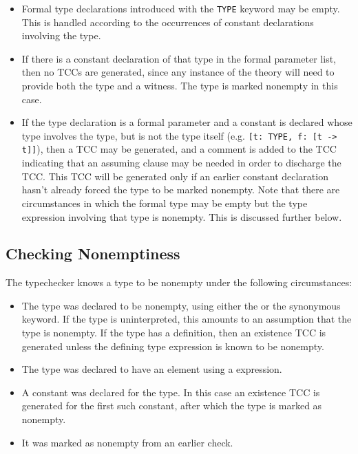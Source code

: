 \begin{itemize}

\item Formal type declarations introduced with the \texttt{TYPE} keyword may
be empty.  This is handled according to the occurrences of constant
declarations involving the type.

\item If there is a constant declaration of that type in the formal
parameter list, then no TCCs are generated, since
any instance of the theory will need to provide both the type and a
witness.  The type is marked nonempty in this case.

\item If the type declaration is a formal parameter and a constant is
declared whose type involves the type, but is not the type itself (e.g.
\texttt{[t:\ TYPE, f:\ [t -> t]]}), then a
TCC may be generated, and a comment is added to the TCC indicating that an
assuming clause may be needed in order to discharge the TCC.  This TCC
will be generated only if an earlier constant declaration hasn't already
forced the type to be marked nonempty.  Note that there are circumstances
in which the formal type may be empty but the type expression involving
that type is nonempty.  This is discussed further below.

\end{itemize}

\subsection{Checking Nonemptiness}
The typechecker knows a type to be nonempty under the
following circumstances:
\begin{itemize}

\item The type was declared to be nonempty, using either the
 or
the synonymous  keyword.  If the
type is uninterpreted, this amounts to an assumption that the type is
nonempty.  If the type has a definition, then an existence TCC is
generated unless the defining type expression is known to be nonempty.

\item The type was declared to have an element using a
 expression.

\item A constant was declared for the type.  In this case an existence TCC
is generated for the first such constant, after which the type is marked
as nonempty.

\item It was marked as nonempty from an earlier check.

\end{itemize}

